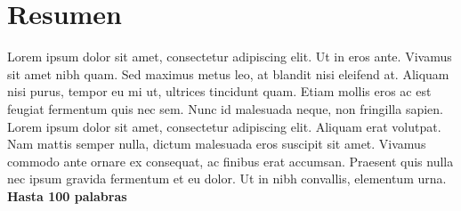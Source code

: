 \section{Resumen}
Lorem ipsum dolor sit amet, consectetur adipiscing elit. Ut in eros ante. Vivamus sit amet nibh quam. Sed maximus metus leo, at blandit nisi eleifend at. Aliquam nisi purus, tempor eu mi ut, ultrices tincidunt quam. Etiam mollis eros ac est feugiat fermentum quis nec sem. Nunc id malesuada neque, non fringilla sapien. Lorem ipsum dolor sit amet, consectetur adipiscing elit. Aliquam erat volutpat. Nam mattis semper nulla, dictum malesuada eros suscipit sit amet. Vivamus commodo ante ornare ex consequat, ac finibus erat accumsan. Praesent quis nulla nec ipsum gravida fermentum et eu dolor. Ut in nibh convallis, elementum urna. {\bf \Large Hasta 100 palabras}
